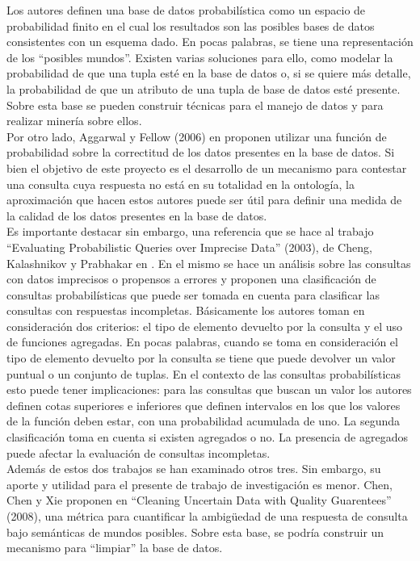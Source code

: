 Los autores definen  una base de datos probabilística como un espacio de probabilidad finito en el cual los resultados son las posibles bases de datos consistentes con un esquema dado. En pocas palabras, se tiene una representación de los “posibles mundos”. Existen varias soluciones para ello, como modelar la probabilidad de que una tupla esté en la base de datos o, si se quiere más detalle, la probabilidad de que un atributo de una tupla de base de datos esté presente. Sobre esta base se pueden construir técnicas para el manejo de datos y para realizar minería sobre ellos. \\

Por otro lado, Aggarwal y Fellow (2006) en \cite{surveyUDAA} proponen  utilizar una función de probabilidad sobre la correctitud de los datos presentes en la base de datos. Si bien el objetivo de este proyecto es el desarrollo de un mecanismo para contestar una consulta cuya respuesta no está en su totalidad en la ontología, la aproximación que hacen estos autores puede ser útil para definir una medida de la calidad de los datos presentes en la base de datos. \\

Es importante destacar sin embargo, una referencia que se hace al trabajo “Evaluating Probabilistic Queries over Imprecise Data” (2003), de Cheng, Kalashnikov y Prabhakar en \cite{evaluatingProbabilisticQueriesOverImpreciseData}. En el mismo se hace un análisis sobre las consultas con datos imprecisos o propensos a errores y proponen una clasificación de consultas probabilísticas que puede ser tomada en cuenta para clasificar las consultas con respuestas incompletas. Básicamente los autores toman en consideración dos criterios: el tipo de elemento devuelto por la consulta y el uso de funciones agregadas. En pocas palabras, cuando se toma en consideración el tipo de elemento devuelto por la consulta se tiene que puede devolver un valor puntual o un conjunto de tuplas. En el contexto de las consultas probabilísticas esto puede tener implicaciones: para las consultas que buscan un valor los autores definen cotas superiores e inferiores que definen intervalos en los que los valores de la función deben estar, con una probabilidad acumulada de uno. La segunda clasificación toma en cuenta si existen agregados o no. La presencia de agregados puede afectar la evaluación de consultas incompletas. \\

Además de estos dos trabajos se han examinado otros tres. Sin embargo, su aporte y utilidad  para el presente de trabajo de investigación es menor. Chen, Chen y Xie proponen en “Cleaning Uncertain Data with Quality Guarentees” (2008)\cite{cleaningUncertainDataWithQualityGuarantees}, una métrica para cuantificar la ambigüedad de una respuesta de consulta bajo semánticas de mundos posibles. Sobre esta base, se podría construir un mecanismo para “limpiar” la base de datos. \\

